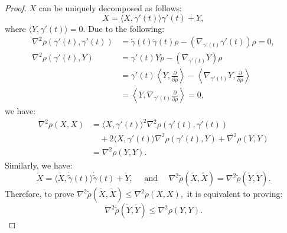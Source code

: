 \documentclass{ctexart}
\begin{document}
\begin{proof}[Proof]
  $X$ can be uniquely decomposed as follows:
  $$
  X = \langle X, \gamma'(t)\rangle {\gamma}'(t) + Y,
  $$
  where $\langle Y, \gamma'(t)\rangle = 0$. Due to the following:
  $$
  \begin{aligned}
  \nabla^2 \rho(\gamma'(t), \gamma'(t)) &= \dot{\gamma}(t) \dot{\gamma}(t) \rho - \left(\nabla_{\gamma'(t)} \gamma'(t)\right) \rho = 0, \\
  \nabla^2 \rho(\gamma'(t), Y) &= \gamma'(t) Y \rho - \left(\nabla_{\gamma'(t)} Y\right) \rho \\
  &= \gamma'(t) \left\langle Y, \frac{\partial}{\partial \rho}\right\rangle - \left\langle\nabla_{\gamma'(t)} Y, \frac{\partial}{\partial \rho}\right\rangle \\
  &= \left\langle Y, \nabla_{\gamma'(t)} \frac{\partial}{\partial \rho}\right\rangle = 0,
  \end{aligned}
  $$
  we have:
  $$
  \begin{aligned}
  \nabla^2 \rho(X, X) 
  &= \langle X, \gamma'(t)\rangle^2 \nabla^2 \rho(\gamma'(t), \gamma'(t)) \\
  &\quad + 2\langle X, \gamma'(t)\rangle \nabla^2 \rho(\gamma'(t), Y) + \nabla^2 \rho(Y, Y)  \\
  &= \nabla^2 \rho(Y, Y).
  \end{aligned}
  $$
  Similarly, we have:
  $$
  \tilde{X} = \langle\tilde{X}, \dot{\widetilde{\gamma}}(t)\rangle \dot{\widetilde{\gamma}}(t) + \widetilde{Y}, \quad \text{ and }\quad
  \nabla^2 \widetilde{\rho}(\tilde{X}, \widetilde{X}) = \nabla^2 \widetilde{\rho}(\tilde{Y}, \widetilde{Y}).
  $$
  Therefore, to prove $\nabla^2 \widetilde{\rho}(\tilde{X}, \widetilde{X}) \leq \nabla^2 \rho(X, X),$ it is equivalent to proving:
  $$
  \nabla^2 \widetilde{\rho}(\tilde{Y}, \tilde{Y}) \leq \nabla^2 \rho(Y, Y).
  $$


\end{proof}
\end{document}
